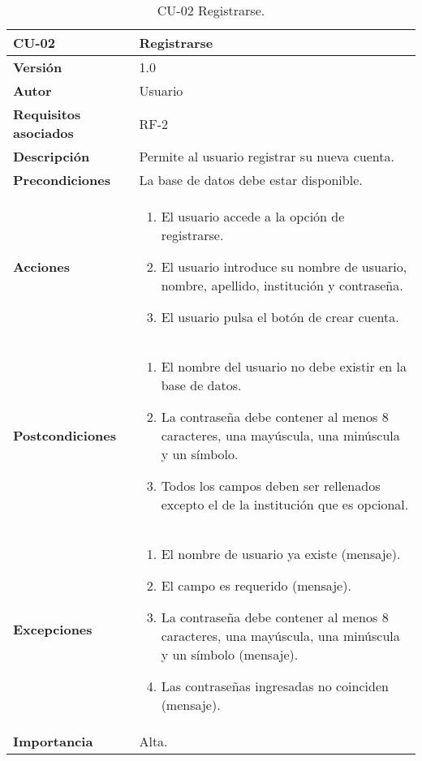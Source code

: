 \begin{table}[h!]
	\centering
	\begin{tabularx}{\linewidth}{ p{} p{} }
		\toprule
		\textbf{CU-02}    & \textbf{Registrarse}\\
		\toprule
		\textbf{Versión}              & 1.0    \\
		\textbf{Autor}                & Usuario \\
		\textbf{Requisitos asociados} & RF-2\\
		\textbf{Descripción}          & Permite al usuario registrar su nueva cuenta. \\
		\textbf{Precondiciones}         & La base de datos debe estar disponible. \\
		\textbf{Acciones}             &
		\begin{enumerate}
			\def\labelenumi{\arabic{enumi}.}
			\tightlist
			\item El usuario accede a la opción de registrarse.
			\item El usuario introduce su nombre de usuario, nombre, apellido, institución y contraseña.
            \item El usuario pulsa el botón de crear cuenta.
		\end{enumerate}\\
         \textbf{Postcondiciones}             &
		\begin{enumerate}
			\def\labelenumi{\arabic{enumi}.}
			\tightlist
			\item El nombre del usuario no debe existir en la base de datos.
			\item La contraseña debe contener al menos 8 caracteres, una mayúscula, una minúscula y un símbolo.
            \item Todos los campos deben ser rellenados excepto el de la institución que es opcional.
		\end{enumerate}\\
		\textbf{Excepciones}             &
		\begin{enumerate}
			\def\labelenumi{\arabic{enumi}.}
			\tightlist
			\item El nombre de usuario ya existe (mensaje).
			\item El campo es requerido (mensaje).
            \item La contraseña debe contener al menos 8 caracteres, una mayúscula, una minúscula y un símbolo (mensaje).
            \item Las contraseñas ingresadas no coinciden (mensaje).
		\end{enumerate}\\
		\textbf{Importancia}          & Alta. \\
		\bottomrule
	\end{tabularx}
	\caption{CU-02 Registrarse.}
\end{table}


